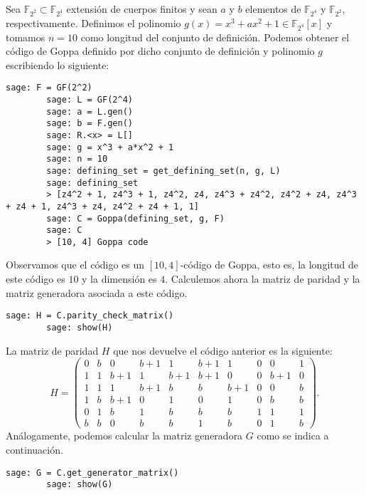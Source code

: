 \begin{exampleth}
    Sea $\mathbb{F}_{2^2} \subset \mathbb{F}_{2^4}$ extensión de cuerpos finitos y sean $a$ y $b$ elementos de $\mathbb{F}_{2^4}$ y $\mathbb{F}_{2^2}$, respectivamente. Definimos el polinomio $g(x) = x^3 + ax^2 + 1 \in \mathbb{F}_{2^4}[x]$ y tomamos $n = 10$ como longitud del conjunto de definición. Podemos obtener el código de Goppa definido por dicho conjunto de definición y polinomio $g$ escribiendo lo siguiente:

    \begin{lstlisting}[gobble=4]
        sage: F = GF(2^2)
        sage: L = GF(2^4)
        sage: a = L.gen()
        sage: b = F.gen()
        sage: R.<x> = L[]
        sage: g = x^3 + a*x^2 + 1
        sage: n = 10
        sage: defining_set = get_defining_set(n, g, L)
        sage: defining_set
        > [z4^2 + 1, z4^3 + 1, z4^2, z4, z4^3 + z4^2, z4^2 + z4, z4^3 + z4 + 1, z4^3 + z4, z4^2 + z4 + 1, 1]
        sage: C = Goppa(defining_set, g, F)
        sage: C
        > [10, 4] Goppa code
    \end{lstlisting}

    Observamos que el código es un $[10, 4]$-código de Goppa, esto es, la longitud de este código es $10$ y la dimensión es $4$. Calculemos ahora la matriz de paridad y la matriz generadora asociada a este código.

    \begin{lstlisting}[gobble=4]
        sage: H = C.parity_check_matrix()
        sage: show(H)
    \end{lstlisting}

    La matriz de paridad $H$ que nos devuelve el código anterior es la siguiente:
    \[
        H = \left(\begin{array}{rrrrrrrrrr}
            0 & b & 0 & b + 1 & 1 & b + 1 & 1 & 0 & 0 & 1 \\
            1 & 1 & b + 1 & 1 & b + 1 & b + 1 & 0 & 0 & b + 1 & 0 \\
            1 & 1 & 1 & b + 1 & b & b & b + 1 & 0 & 0 & b \\
            1 & b & b + 1 & 0 & 1 & 0 & 1 & 0 & b & b \\
            0 & 1 & b & 1 & b & b & b & 1 & 1 & 1 \\
            b & b & 0 & b & b & 1 & b & 0 & 1 & b
            \end{array}
        \right).
    \]
    Análogamente, podemos calcular la matriz generadora $G$ como se indica a continuación.

    \begin{lstlisting}[gobble=4]
        sage: G = C.get_generator_matrix()
        sage: show(G)
    \end{lstlisting}


\end{exampleth}
